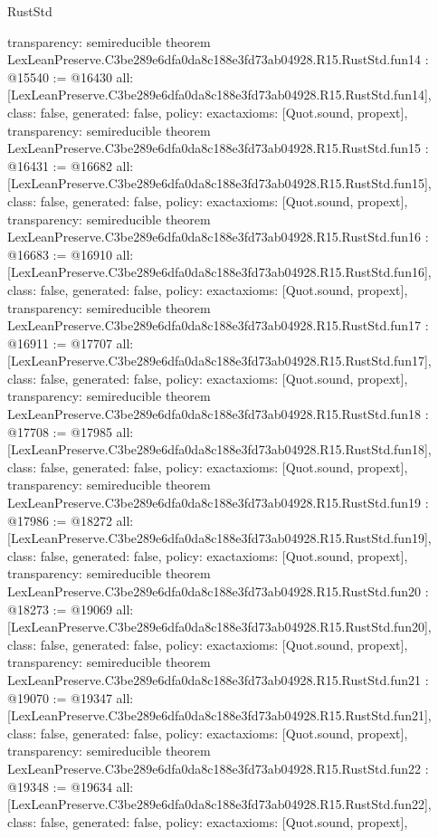 \begin{lexlean}{RustStd}
\begin{coremodule}
{  transparency: semireducible
}
theorem LexLeanPreserve.C3be289e6dfa0da8c188e3fd73ab04928.R15.RustStd.fun14 : @15540 := @16430 {
  all: [LexLeanPreserve.C3be289e6dfa0da8c188e3fd73ab04928.R15.RustStd.fun14],
  class: false,
  generated: false,
  policy: exact{axioms: [Quot.sound, propext]},
  transparency: semireducible
}
theorem LexLeanPreserve.C3be289e6dfa0da8c188e3fd73ab04928.R15.RustStd.fun15 : @16431 := @16682 {
  all: [LexLeanPreserve.C3be289e6dfa0da8c188e3fd73ab04928.R15.RustStd.fun15],
  class: false,
  generated: false,
  policy: exact{axioms: [Quot.sound, propext]},
  transparency: semireducible
}
theorem LexLeanPreserve.C3be289e6dfa0da8c188e3fd73ab04928.R15.RustStd.fun16 : @16683 := @16910 {
  all: [LexLeanPreserve.C3be289e6dfa0da8c188e3fd73ab04928.R15.RustStd.fun16],
  class: false,
  generated: false,
  policy: exact{axioms: [Quot.sound, propext]},
  transparency: semireducible
}
theorem LexLeanPreserve.C3be289e6dfa0da8c188e3fd73ab04928.R15.RustStd.fun17 : @16911 := @17707 {
  all: [LexLeanPreserve.C3be289e6dfa0da8c188e3fd73ab04928.R15.RustStd.fun17],
  class: false,
  generated: false,
  policy: exact{axioms: [Quot.sound, propext]},
  transparency: semireducible
}
theorem LexLeanPreserve.C3be289e6dfa0da8c188e3fd73ab04928.R15.RustStd.fun18 : @17708 := @17985 {
  all: [LexLeanPreserve.C3be289e6dfa0da8c188e3fd73ab04928.R15.RustStd.fun18],
  class: false,
  generated: false,
  policy: exact{axioms: [Quot.sound, propext]},
  transparency: semireducible
}
theorem LexLeanPreserve.C3be289e6dfa0da8c188e3fd73ab04928.R15.RustStd.fun19 : @17986 := @18272 {
  all: [LexLeanPreserve.C3be289e6dfa0da8c188e3fd73ab04928.R15.RustStd.fun19],
  class: false,
  generated: false,
  policy: exact{axioms: [Quot.sound, propext]},
  transparency: semireducible
}
theorem LexLeanPreserve.C3be289e6dfa0da8c188e3fd73ab04928.R15.RustStd.fun20 : @18273 := @19069 {
  all: [LexLeanPreserve.C3be289e6dfa0da8c188e3fd73ab04928.R15.RustStd.fun20],
  class: false,
  generated: false,
  policy: exact{axioms: [Quot.sound, propext]},
  transparency: semireducible
}
theorem LexLeanPreserve.C3be289e6dfa0da8c188e3fd73ab04928.R15.RustStd.fun21 : @19070 := @19347 {
  all: [LexLeanPreserve.C3be289e6dfa0da8c188e3fd73ab04928.R15.RustStd.fun21],
  class: false,
  generated: false,
  policy: exact{axioms: [Quot.sound, propext]},
  transparency: semireducible
}
theorem LexLeanPreserve.C3be289e6dfa0da8c188e3fd73ab04928.R15.RustStd.fun22 : @19348 := @19634 {
  all: [LexLeanPreserve.C3be289e6dfa0da8c188e3fd73ab04928.R15.RustStd.fun22],
  class: false,
  generated: false,
  policy: exact{axioms: [Quot.sound, propext]},
}
\end{coremodule}
\end{lexlean}
